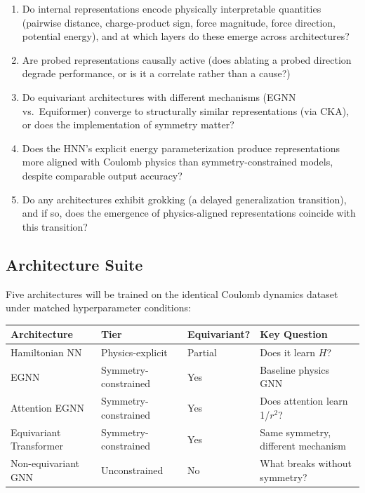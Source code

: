 \documentclass[12pt]{article}
\begin{document}
\begin{enumerate} \item Do internal representations encode physically
  interpretable quantities (pairwise distance, charge-product sign, force
  magnitude, force direction, potential energy), and at which layers do these
  emerge across architectures? \item Are probed representations causally active
  (does ablating a probed direction degrade performance, or is it a correlate
  rather than a cause?) \item Do equivariant architectures with different
  mechanisms (EGNN vs.\ Equiformer) converge to structurally similar
  representations (via CKA), or does the implementation of symmetry matter?
  \item Does the HNN's explicit energy parameterization produce representations
    more aligned with Coulomb physics than symmetry-constrained models, despite
    comparable output accuracy? \item Do any architectures exhibit grokking (a
    delayed generalization transition), and if so, does the emergence of
    physics-aligned representations coincide with this transition?
\end{enumerate}

\subsection{Architecture Suite}

Five architectures will be trained on the identical Coulomb dynamics dataset
under matched hyperparameter conditions:

\begin{center} \renewcommand{\arraystretch}{1.3} \begin{tabular}{llll} \toprule
  \textbf{Architecture}        & \textbf{Tier}             &
  \textbf{Equivariant?} & \textbf{Key Question} \\ \midrule Hamiltonian NN &
  Physics-explicit          & Partial & Does it learn $H$? \\ EGNN &
  Symmetry-constrained      & Yes     & Baseline physics GNN \\ Attention EGNN &
  Symmetry-constrained      & Yes & Does attention learn 1/$r^2$? \\ Equivariant
  Transformer      & Symmetry-constrained      & Yes     & Same symmetry,
different mechanism \\ Non-equivariant GNN          & Unconstrained & No      &
What breaks without symmetry? \\ \bottomrule \end{tabular} \end{center}
\end{document}
